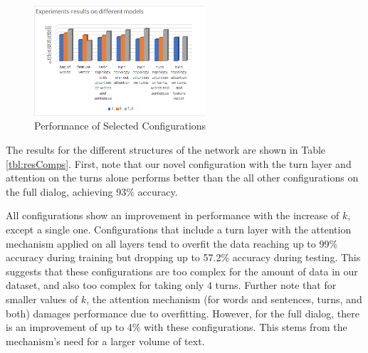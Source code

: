 \begin{figure}[]
    \hspace*{-0.8cm}
    \centering
        \centering
        \includegraphics[trim=0cm 0.5cm 0cm 0cm, width=2.5in]{exp/exp.png}
        \caption{Performance of Selected Configurations}
        \label{graph:quality}
    \vspace{-4mm}
\end{figure}


The results for the different structures of the network are shown in Table \ref{tbl:resComps}. 
First, note that our novel configuration with the turn layer and attention on the turns alone 
performs better than the all other configurations on the full dialog, 
achieving 93\% accuracy.

All configurations show an improvement in performance with the increase of $k$, 
except a single one. 
Configurations that include a turn layer with the attention mechanism applied on all layers 
tend to overfit the data reaching up to 99\% accuracy during training but 
dropping up to 57.2\% accuracy during testing. 
This suggests that these configurations are too complex for the amount of data in our dataset,
and also too complex for taking only 4 turns. 
Further note that for smaller values of $k$, the attention mechanism 
(for words and sentences, turns, and both) damages performance due to overfitting. 
However, for the full dialog, there is an improvement of up to 4\% with these configurations. 
This stems from the mechanism's need for a larger volume of text.

